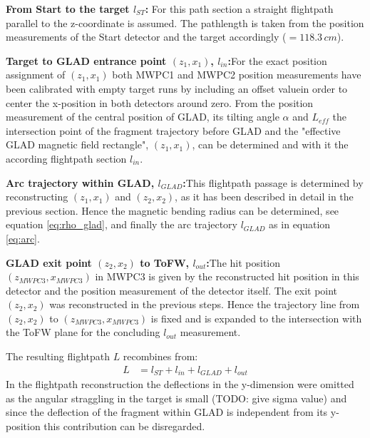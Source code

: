 \begin{description}
\item \textbf{From Start to the target $l_{ST}$:} For this path section a straight flightpath parallel to the z-coordinate is assumed. The pathlength is taken from the position measurements of the Start detector and the target accordingly ($=118.3\,cm$). 
\item \textbf{Target to GLAD entrance point $(z_1,x_1)$, $l_{in}$:}For the  exact position assignment of $(z_1,x_1)$ both MWPC1 and MWPC2 position measurements have been calibrated with empty target runs by including an offset valuein order to center the x-position in both detectors around zero. From the position measurement of the central position of GLAD, its tilting angle $\alpha$ and $L_{eff}$ the intersection point of the fragment trajectory before GLAD and the "effective GLAD magnetic field rectangle", $(z_1,x_1)$, can be determined and with it the according flightpath section $l_{in}$.
\item \textbf{Arc trajectory within GLAD, ${l_{GLAD}}$:}This flightpath passage is determined by reconstructing $(z_1,x_1)$ and $(z_2,x_2)$, as it has been described in detail in the previous section. Hence the magnetic bending radius can be determined, see equation \ref{eq:rho_glad}, and finally the arc trajectory ${l_{GLAD}}$ as in equation \ref{eq:arc}.
\item \textbf{GLAD exit point $(z_2,x_2)$ to ToFW, $l_{out}$:}The hit position $(z_{MWPC3},x_{MWPC3})$ in MWPC3 is given by the reconstructed hit position in this detector and the position measurement of the detector itself. The exit point $(z_2,x_2)$ was reconstructed in the previous steps. Hence the trajectory line from $(z_2,x_2)$ to $(z_{MWPC3},x_{MWPC3})$ is fixed and is expanded to the intersection with the ToFW plane for the concluding $l_{out}$ measurement.  
\end{description}
The resulting flightpath $L$ recombines from:
\begin{align*}
L &= l_{ST}+l_{in}+l_{GLAD} + l_{out} 
\end{align*}
In the flightpath reconstruction the deflections in the y-dimension were omitted as the angular straggling in the target is small (TODO: give sigma value) and since the deflection of the fragment within GLAD is independent from its  y-position this contribution can be disregarded.


